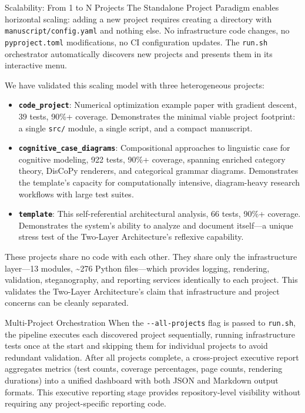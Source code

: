 \documentclass[
  ignorenonframetext,
]{beamer}
\author{\texorpdfstring{}{}}
\date{}
\providecommand{\tightlist}{%
  \setlength{\itemsep}{0pt}\setlength{\parskip}{0pt}}
\begin{document}
\begin{frame}[fragile]{Scalability: From 1 to N Projects}
\protect{}\label{scalability-from-1-to-n-projects}
The Standalone Project Paradigm enables horizontal scaling: adding a new
project requires creating a directory with
\texttt{manuscript/config.yaml} and nothing else. No infrastructure code
changes, no \texttt{pyproject.toml} modifications, no CI configuration
updates. The \texttt{run.sh} orchestrator automatically discovers new
projects and presents them in its interactive menu.

We have validated this scaling model with three heterogeneous projects:

\begin{itemize}
\tightlist
\item
  \textbf{\texttt{code\_project}}: Numerical optimization example paper
  with gradient descent, 39 tests, 90\%+ coverage. Demonstrates the
  minimal viable project footprint: a single \texttt{src/} module, a
  single script, and a compact manuscript.
\item
  \textbf{\texttt{cognitive\_case\_diagrams}}: Compositional approaches
  to linguistic case for cognitive modeling, 922 tests, 90\%+ coverage,
  spanning enriched category theory, DisCoPy renderers, and categorical
  grammar diagrams. Demonstrates the template's capacity for
  computationally intensive, diagram-heavy research workflows with large
  test suites.
\item
  \textbf{\texttt{template}}: This self-referential architectural
  analysis, 66 tests, 90\%+ coverage. Demonstrates the system's ability
  to analyze and document itself---a unique stress test of the Two-Layer
  Architecture's reflexive capability.
\end{itemize}

These projects share no code with each other. They share only the
infrastructure layer---13 modules, \textasciitilde276 Python
files---which provides logging, rendering, validation, steganography,
and reporting services identically to each project. This validates the
Two-Layer Architecture's claim that infrastructure and project concerns
can be cleanly separated.

\begin{block}{Multi-Project Orchestration}
\protect{}\label{multi-project-orchestration}
When the \texttt{-\/-all-projects} flag is passed to \texttt{run.sh},
the pipeline executes each discovered project sequentially, running
infrastructure tests once at the start and skipping them for individual
projects to avoid redundant validation. After all projects complete, a
cross-project executive report aggregates metrics (test counts, coverage
percentages, page counts, rendering durations) into a unified dashboard
with both JSON and Markdown output formats. This executive reporting
stage provides repository-level visibility without requiring any
project-specific reporting code.
\end{block}


\end{frame}
\end{document}
